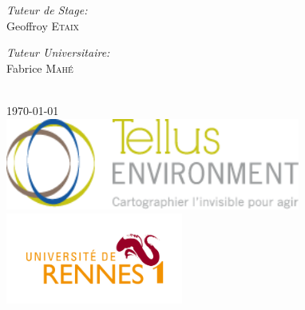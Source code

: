 \documentclass[12pt,a4paper]{report}
\begin{document}
\begin{titlepage}
\begin{minipage}{0.4\textwidth}
\begin{flushright}
	\emph{Tuteur de Stage:} \\
	Geoffroy \textsc{Etaix}
\end{flushright}

\begin{flushright} \large
	\emph{Tuteur Universitaire:} \\
	Fabrice \textsc{Mahé} 
\end{flushright}

\end{minipage}\\[1cm]



{\large \today}\\[1cm] %

\includegraphics[height=3cm]{img/logo-tellusenv.png} \\
\includegraphics[height=3cm]{img/univ.jpeg}\\[1cm] %
 

\vfill %

\end{titlepage}
\end{document}

